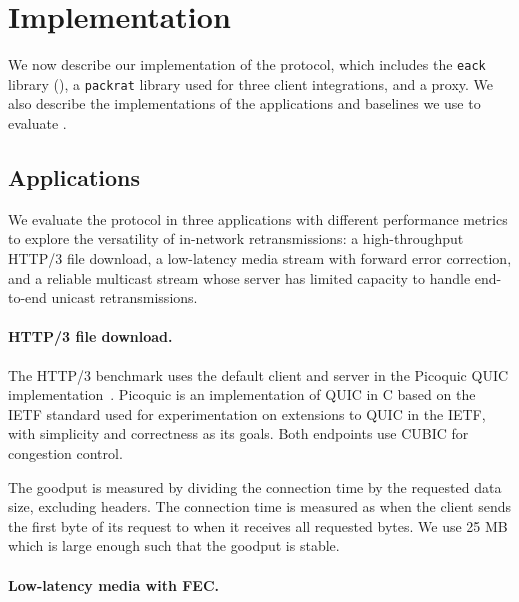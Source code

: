 \section{Implementation}
\label{sec:implementation}

We now describe our implementation of the \Sys protocol, which includes
the \texttt{eack} library (),
a \texttt{packrat} library used for three client integrations,
and a \Sys proxy. We also describe the implementations of the
applications and baselines we use to evaluate \Sys.

\subsection{Applications}

We evaluate the \Sys protocol in three applications with different performance
metrics to explore the versatility of in-network retransmissions:
a high-throughput HTTP/3 file download, a low-latency media stream with forward
error correction, and a reliable multicast stream whose server has limited
capacity to handle end-to-end unicast retransmissions.

\paragraph{HTTP/3 file download.}

The HTTP/3 benchmark uses the default client and server in the Picoquic QUIC
implementation~\cite{picoquic}. Picoquic is an implementation of QUIC in C
based on the IETF standard used for experimentation on extensions to QUIC in
the IETF, with simplicity and correctness as its goals. Both endpoints use
CUBIC for congestion control.


The goodput is measured by dividing the connection time by the requested data
size, excluding headers.
The connection time is measured as when the client sends the first
byte of its request to when it receives all requested bytes.
We use 25 MB which is large enough such that the goodput is stable.

\paragraph{Low-latency media with FEC.}

